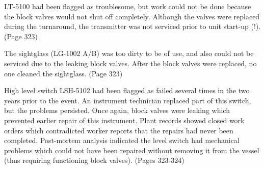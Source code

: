 \vskip 10pt

LT-5100 had been flagged as troublesome, but work could not be done because the block valves would not shut off completely.  Although the valves were replaced during the turnaround, the transmitter was not serviced prior to unit start-up (!).  (Page 323)

\vskip 10pt

The sightglass (LG-1002 A/B) was too dirty to be of use, and also could not be serviced due to the leaking block valves.  After the block valves were replaced, no one cleaned the sightglass.  (Page 323)

\vskip 20pt

High level switch LSH-5102 had been flagged as failed several times in the two years prior to the event.  An instrument technician replaced part of this switch, but the problems persisted.  Once again, block valves were leaking which prevented earlier repair of this instrument.  Plant records showed closed work orders which contradicted worker reports that the repairs had never been completed.  Post-mortem analysis indicated the level switch had mechanical problems which could not have been repaired without removing it from the vessel (thus requiring functioning block valves).  (Pages 323-324)






